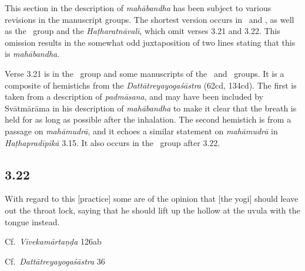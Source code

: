 \begin{ekdosis}
\begin{philcomm}[hp03_021]
This section in the description of \emph{mahābandha} has been subject to various revisions in the manuscript groups. The shortest version occurs in \alphaOne\ and \alphaTwo, as well as the \textbeta\ group and the \emph{Haṭharatnāvalī}, which omit verses 3.21 and 3.22. This omission results in the somewhat odd juxtaposition of two lines stating that this is \emph{mahābandha}. 

Verse 3.21 is in the \textgamma\ group and some manuscripts of the \textbeta\ and \texteta\ groups. It is a composite of hemistichs from the \emph{Dattātreyayogaśāstra} (62cd, 134cd). The first is taken from a description of \emph{padmāsana}, and may have been included by Svātmārāma in his description of \emph{mahābandha} to make it clear that the breath is held for as long as possible after the inhalation. The second hemistich is from a passage on \emph{mahāmudrā}, and it echoes a similar statement on \emph{mahāmudrā} in \emph{Haṭhapradīpikā} 3.15. It also occurs in the \textalpha\ group after 3.22.
\end{philcomm}



\subsection*{3.22}
\begin{translation}[hp03_022]
With regard to this [practice] some are of the opinion that [the yogi] should leave out the throat lock, saying that he should lift up the hollow at the uvula with the tongue instead.
\end{translation}

\begin{sources}[hp03_022]
Cf.~\emph{Vivekamārtaṇḍa} 126ab
\begin{versinnote}
\end{versinnote}
Cf.~\emph{Dattātreyayogaśāstra} 36
\begin{versinnote}
\end{versinnote}
\end{sources}


\end{ekdosis}
